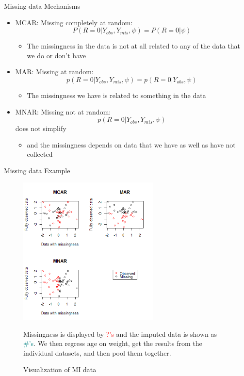 \begin{frame}{Missing data Mechanisms}
\begin{itemize}

\item MCAR: Missing completely at random:  $$P(R=0|Y_{obs},Y_{mis},\psi)=P(R=0|\psi)$$
\begin{itemize}
\item The missingness in the data is not at all related to any of the data that we do or don't have
\end{itemize}
\item MAR: Missing at random: $$p(R=0|Y_{obs},Y_{mis},\psi)= p(R=0|Y_{obs},\psi)$$
\begin{itemize}
 \item The missingness we have is related to something in the data 
\end{itemize}
\item MNAR: Missing not at random: $$p(R=0|Y_{obs},Y_{mis},\psi)$$ does not simplify
\begin{itemize}
 \item  and the missingness depends on data that we have as well as have not collected
\end{itemize}
\end{itemize}
\end{frame}

\begin{frame}{Missing data Example}

 \begin{figure}[h!]
  \centering
    \includegraphics[width=0.63\textwidth]{md_mechanism}
  \caption{Visualization of MI data}
\label{fig:miviz}
\medskip
\small
Missingness is displayed by \textcolor{red}{?'s} and the imputed data is shown  as \textcolor{teal}{\#'s}.
We then regress age on weight, get the results from the individual datasets, and then pool them together.
\end{figure}
 
\end{frame}

